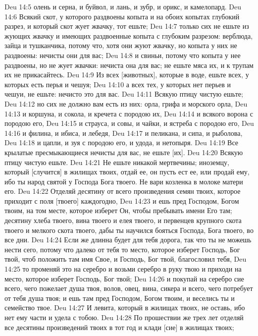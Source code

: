 Deu 14:5  олень и серна, и буйвол, и лань, и зубр, и орикс, и камелопард.
Deu 14:6  Всякий скот, у которого раздвоены копыта и на обоих копытах глубокий разрез, и который скот жует жвачку, тот ешьте;
Deu 14:7  только сих не ешьте из жующих жвачку и имеющих раздвоенные копыта с глубоким разрезом: верблюда, зайца и тушканчика, потому что, хотя они жуют жвачку, но копыта у них не раздвоены: нечисты они для вас;
Deu 14:8  и свиньи, потому что копыта у нее раздвоены, но не жует жвачки: нечиста она для вас; не ешьте мяса их, и к трупам их не прикасайтесь.
Deu 14:9  Из всех [животных], которые в воде, ешьте всех, у которых есть перья и чешуя;
Deu 14:10  а всех тех, у которых нет перьев и чешуи, не ешьте: нечисто это для вас.
Deu 14:11  Всякую птицу чистую ешьте;
Deu 14:12  но сих не должно вам есть из них: орла, грифа и морского орла,
Deu 14:13  и коршуна, и сокола, и кречета с породою их,
Deu 14:14  и всякого ворона с породою его,
Deu 14:15  и страуса, и совы, и чайки, и ястреба с породою его,
Deu 14:16  и филина, и ибиса, и лебедя,
Deu 14:17  и пеликана, и сипа, и рыболова,
Deu 14:18  и цапли, и зуя с породою его, и удода, и нетопыря.
Deu 14:19  Все крылатые пресмыкающиеся нечисты для вас, не ешьте [их].
Deu 14:20  Всякую птицу чистую ешьте.
Deu 14:21  Не ешьте никакой мертвечины; иноземцу, который [случится] в жилищах твоих, отдай ее, он пусть ест ее, или продай ему, ибо ты народ святой у Господа Бога твоего. Не вари козленка в молоке матери его.
Deu 14:22  Отделяй десятину от всего произведения семян твоих, которое приходит с поля [твоего] каждогодно,
Deu 14:23  и ешь пред Господом, Богом твоим, на том месте, которое изберет Он, чтобы пребывать имени Его там; десятину хлеба твоего, вина твоего и елея твоего, и первенцев крупного скота твоего и мелкого скота твоего, дабы ты научился бояться Господа, Бога твоего, во все дни.
Deu 14:24  Если же длинна будет для тебя дорога, так что ты не можешь нести сего, потому что далеко от тебя то место, которое изберет Господь, Бог твой, чтоб положить там имя Свое, и Господь, Бог твой, благословил тебя,
Deu 14:25  то променяй это на серебро и возьми серебро в руку твою и приходи на место, которое изберет Господь, Бог твой;
Deu 14:26  и покупай на серебро сие всего, чего пожелает душа твоя, волов, овец, вина, сикера и всего, чего потребует от тебя душа твоя; и ешь там пред Господом, Богом твоим, и веселись ты и семейство твое.
Deu 14:27  И левита, который в жилищах твоих, не оставь, ибо нет ему части и удела с тобою.
Deu 14:28  По прошествии же трех лет отделяй все десятины произведений твоих в тот год и клади [сие] в жилищах твоих;
